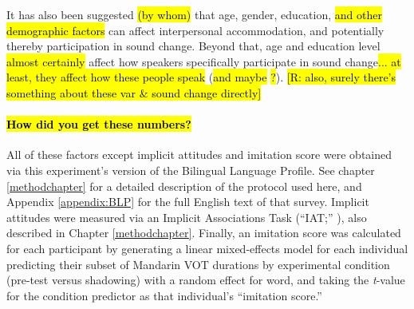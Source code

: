 It has also been suggested \hl{(by whom)} that age, gender, education, \hl{and other demographic factors} can affect interpersonal accommodation, and potentially thereby participation in sound change. Beyond that, age and education level \hl{almost certainly} affect how \ND{} speakers specifically participate in sound change\hl{... at least, they affect how these people speak \ND{}} \citep{bao1980sixty} (\hl{and maybe} \citealp{xu2006nanjing}\hl{?}). \hl{[R: also, surely there's something about these var & sound change directly]}

\paragraph{\hl{How did you get these numbers?}}
All of these factors except implicit attitudes and imitation score were obtained via this experiment's version of the Bilingual Language Profile. See chapter \ref{methodchapter} for a detailed description of the protocol used here, and Appendix \ref{appendix:BLP} for the full English text of that survey. Implicit attitudes were measured via an Implicit Associations Task (``IAT;'' \citealp{greenwald1998measuring,greenwald2003understanding}), also described in Chapter \ref{methodchapter}. Finally, an imitation score was calculated for each participant by generating a linear mixed-effects model for each individual predicting their subset of Mandarin VOT durations by experimental condition (pre-test versus shadowing) with a random effect for word, and taking the \textit{t}-value for the condition predictor as that individual's ``imitation score.''

